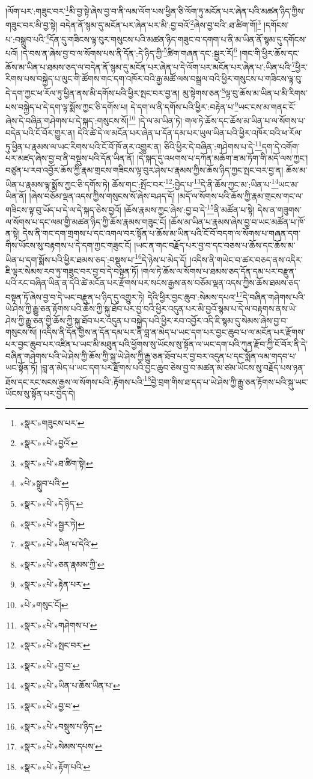 །ལོག་པར་:གཟུང་བར་\footnote{«སྣར་»གཟུངས་པར་}མི་བྱ་སྟེ་ཞེས་བྱ་བ་ནི་ལམ་ལོག་པས་ཕྱིན་ཅི་ལོག་ཏུ་མངོན་པར་ཞེན་པའི་མཚན་ཉིད་ཀྱིས་གཟུང་བར་མི་བྱ་སྟེ། བདེན་ནོ་སྙམ་དུ་མངོན་པར་ཞེན་པར་མི་:བྱ་བའོ་\footnote{«སྣར་»«པེ་»བྱའོ་}ཞེས་བྱ་བའི་:ཐ་ཚིག་གོ།\footnote{«སྣར་»«པེ་»ཐ་ཚིག་སྟེ།} །དགོངས་པ་:བསྒྲུབ་པའི་\footnote{«པེ་»སྒྲུབ་པའི་}དོན་དུ་གཟིངས་ལྟ་བུར་གསུངས་པའི་མཚན་ཉིད་གཟུང་བ་དགག་པ་ནི་མ་ཡིན་ནོ་སྙམ་དུ་དགོངས་པའོ། །དེ་བས་ན་ཞེས་བྱ་བ་ལ་སོགས་པས་ནི་དོན་:དེ་ཉིད་ཀྱི་\footnote{«སྣར་»«པེ་»དེ་ཉིད་}ཚིག་གཞན་དང་:སྦྱར་རོ།\footnote{«སྣར་»«པེ་»སྦྱར་ཏེ།} །གང་གི་ཕྱིར་ཆོས་དང་ཆོས་མ་ཡིན་པ་ཐམས་ཅད་ལ་བདེན་ནོ་སྙམ་དུ་མངོན་པར་ཞེན་པ་དེ་ལོག་པར་མངོན་པར་ཞེན་པ་:ཡིན་པའི་\footnote{«སྣར་»«པེ་»ཡིན་པ་དེའི་}ཕྱིར་རིགས་པས་བསྐྱེད་པ་ལུང་གི་ཚོགས་གང་དག་འཁོར་བའི་རྒྱ་མཚོ་ལས་བསྒྲལ་བའི་ཕྱིར་གསུངས་པ་གཟིངས་ལྟ་བུ་དེ་དག་ཀྱང་ཕ་རོལ་ཏུ་ཕྱིན་ནས་མི་དགོས་པའི་ཕྱིར་སྤང་བར་བྱ་ན། མུ་སྟེགས་ཅན་\footnote{«སྣར་»«པེ་»ཅན་རྣམས་ཀྱི་}ལྟ་བུ་ཆོས་མ་ཡིན་པ་མི་རིགས་པས་བསྐྱེད་པ་དེ་དག་ལྟ་སྨོས་ཀྱང་ཅི་དགོས་པ། དེ་དག་ལ་ནི་དགོས་པའི་ཕྱིར་:བརྟེན་པ་\footnote{«སྣར་»«པེ་»རྟེན་པར་}ཡང་ངས་མ་གནང་ངོ་ཞེས་དེ་བཞིན་གཤེགས་པ་དེ་སྐད་:གསུངས་སོ།\footnote{«པེ་»གསུང་ངོ།} །དེ་ལ་མ་ཡིན་ཏེ། གལ་ཏེ་ཆོས་དང་ཆོས་མ་ཡིན་པ་ལ་སོགས་པ་བདེན་པའི་ངོ་བོར་གྱུར་ན། དེའི་ཚེ་དེ་ལ་མངོན་པར་ཞེན་པ་དོན་དམ་པར་ཡུལ་ཡིན་པའི་ཕྱིར་འཁོར་བའི་ཕ་རོལ་ཏུ་ཕྱིན་པ་རྣམས་ལ་ཡང་རིགས་པའི་ངོ་བོ་ཁོ་ནར་འགྱུར་ན། ཅིའི་ཕྱིར་དེ་བཞིན་:གཤེགས་པ་དེ་\footnote{«སྣར་»«པེ་»གཤེགས་པ་}དག་དེ་འགོག་པར་མཛད་ཞེས་བྱ་བ་ནི་བསྡུས་པའི་དོན་ཡིན་ནོ། །དེ་སྐད་དུ་འཕགས་པ་དཀོན་མཆོག་ཟ་མ་ཏོག་གི་མདོ་ལས་ཀྱང་། བཙུན་པ་རབ་འབྱོར་ཆོས་ཀྱི་རྣམ་གྲངས་གཟིངས་ལྟ་བུར་ཤེས་པ་རྣམས་ཀྱིས་ཆོས་ཉིད་ཀྱང་སྤང་བར་བྱ་ན། ཆོས་མ་ཡིན་པ་རྣམས་ལྟ་སྨོས་ཀྱང་ཅི་དགོས་ཏེ། ཆོས་གང་:སྤོང་བར་\footnote{«སྣར་»«པེ་»སྤང་བར་}:བྱེད་པ་\footnote{«སྣར་»«པེ་»བྱ་བ་}དེ་ནི་ཆོས་ཀྱང་མ་:ཡིན་པ་\footnote{«སྣར་»«པེ་»ཡིན་པ་ཆོས་ཡིན་པ་}ཡང་མ་ཡིན་ནོ། །ཞེས་བཅོམ་ལྡན་འདས་ཀྱིས་གསུངས་སོ་ཞེས་བཤད་དོ། །མདོ་ལ་སོགས་པའི་ཆོས་ཀྱི་རྣམ་གྲངས་གང་ལ་གཟིངས་ལྟ་བུ་ཡོད་པ་དེ་ལ་དེ་སྐད་ཅེས་བྱའོ། །ཆོས་རྣམས་ཀྱང་ཞེས་:བྱ་བ་དེ་\footnote{«སྣར་»«པེ་»བྱ་བ་}ནི་མཚོན་པ་སྟེ། དེས་ན་གཟུགས་ལ་སོགས་པ་དང་ལམ་གྱི་མཚན་ཉིད་ཀྱི་ཆོས་རྣམས་གཟུང་ངོ། །ཆོས་མ་ཡིན་པ་རྣམས་ཞེས་བྱ་བ་ཡང་མཚོན་པ་ཁོ་ན་སྟེ། དེས་ནི་གང་དག་གྲགས་པ་དང་འགལ་བར་སྟོན་པ་ཆོས་མ་ཡིན་པའི་ངོ་བོ་བདག་ལ་སོགས་པ་གཞན་དག་གིས་ཡོངས་སུ་བརྟགས་པ་དེ་དག་ཀྱང་གཟུང་ངོ། །ཡང་ན་གང་བརྗོད་པར་བྱ་བ་དང་བཅས་པ་ཆོས་དང་ཆོས་མ་ཡིན་པ་དག་སྨོས་པའི་ཕྱིར་ཐམས་ཅད་:བསྡུས་པ་\footnote{«སྣར་»«པེ་»བསྡུས་པ་ཉིད་}དེ་ཉེས་པ་མེད་དོ། །འདིས་ནི་གཡེང་བ་ཚར་བཅད་ནས་འདིར་ཇི་ལྟར་སེམས་རབ་ཏུ་གཟུང་བར་བྱ་བ་དེ་བསྟན་ཏོ། །གལ་ཏེ་ཆོས་ལ་སོགས་པ་ཐམས་ཅད་དོན་དམ་པར་བརྫུན་པའི་རང་བཞིན་ཡིན་ན་དེའི་ཚེ་མངོན་པར་རྫོགས་པར་སངས་རྒྱས་ནས་བཅོམ་ལྡན་འདས་ཀྱིས་ཆོས་ཐམས་ཅད་བསྟན་ཏོ་ཞེས་བྱ་བ་དེ་ཡང་བརྫུན་པ་ཉིད་དུ་འགྱུར་ཏེ། དེའི་ཕྱིར་བྱང་ཆུབ་:སེམས་དཔའ་\footnote{«སྣར་»«པེ་»སེམས་དཔས་}དེ་བཞིན་གཤེགས་པའི་ཡེ་ཤེས་ཀྱི་རྒྱུ་ཅན་རྟོགས་པའི་ཆོས་ཀྱི་སྐུ་ཐོབ་པར་བྱ་བའི་ཕྱིར་འདུན་པར་མི་བྱའོ་སྙམ་པ་དེ་ལ་བརྟགས་ནས་ཡེ་ཤེས་ཀྱི་རྒྱུ་ཅན་གྱི་ཆོས་ཀྱི་སྐུ་ཐོབ་པར་འདུན་པ་བསྐྱེད་པའི་ཕྱིར་རབ་འབྱོར་འདི་ཇི་སྙམ་དུ་སེམས་ཞེས་བྱ་བ་གསུངས་སོ། །འདིས་ནི་དོན་གྱིས་ན་དོན་དམ་པར་ནི་བླ་ན་མེད་པ་ཡང་དག་པར་བྱང་ཆུབ་པ་ལ་མངོན་པར་རྫོགས་པར་བྱང་ཆུབ་པར་འཛིན་པ་ཡང་མི་མཐུན་པའི་ཕྱོགས་སུ་ཡོངས་སུ་སྟོན་ལ་ཡང་དག་པའི་ཀུན་རྫོབ་ཀྱི་ངོ་བོར་ནི་དེ་བཞིན་གཤེགས་པའི་ཡེ་ཤེས་ཀྱི་ཆོས་ཀྱི་སྐུ་ཡེ་ཤེས་ཀྱི་རྒྱུ་ཅན་ཐོབ་པར་བྱ་བར་འདུན་པ་དང་སྨོན་ལམ་གདབ་པ་ཡང་སྟོན་ཏོ། །བླ་ན་མེད་པ་ཡང་དག་པར་རྫོགས་པའི་བྱང་ཆུབ་ཅེས་བྱ་བ་མཚན་མ་ཙམ་ཡོངས་སུ་བརྗོད་པས་ཉན་ཐོས་དང་རང་སངས་རྒྱས་ལ་སོགས་པའི་:རྟོགས་པའི་\footnote{«སྣར་»«པེ་»རྟོག་པའི་}བྱེ་བྲག་གིས་ཐ་དད་པ་ཡེ་ཤེས་ཀྱི་རྒྱུ་ཅན་རྟོགས་པའི་སྐུ་ཡང་ཡོངས་སུ་སྟོན་པར་བྱེད་དེ། 